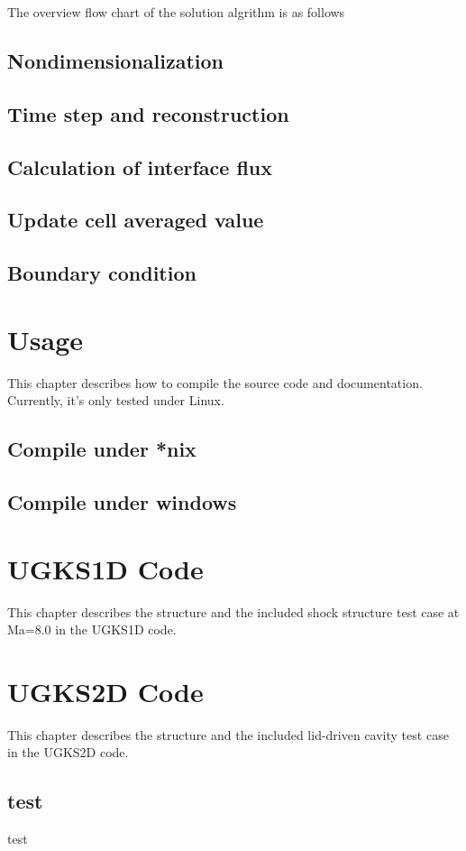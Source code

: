 \documentclass[a4paper]{book}
\begin{document}
The overview flow chart of the solution algrithm is as follows
\section{Nondimensionalization}
\section{Time step and reconstruction}
\section{Calculation of interface flux}
\section{Update cell averaged value}
\section{Boundary condition}

\chapter{Usage}
This chapter describes how to compile the source code and documentation.
Currently, it's only tested under Linux.
\section{Compile under *nix}
\section{Compile under windows}

\chapter{UGKS1D Code}
This chapter describes the structure and the included shock structure test case at Ma=8.0 in the UGKS1D code.

\chapter{UGKS2D Code}
This chapter describes the structure and the included lid-driven cavity test case in the UGKS2D code.
\section{test}
test

\backmatter


\cleardoublepage
{}
{}


\end{document}
